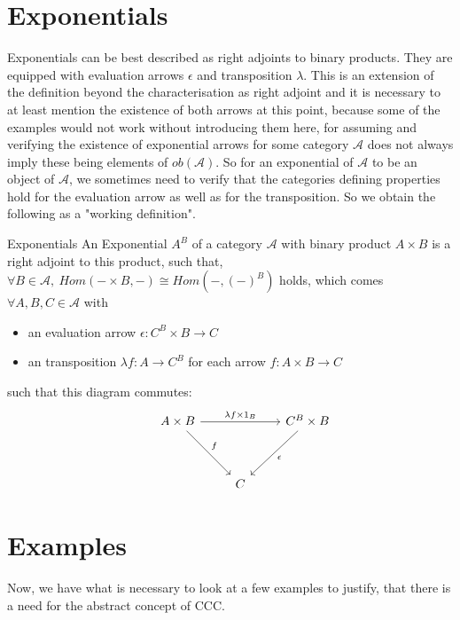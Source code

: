 \section{Exponentials}

Exponentials can be best described as right adjoints to binary products.
They are equipped with evaluation arrows $\epsilon$ and transposition $\lambda$.
This is an extension of the definition beyond the characterisation as right adjoint and it is necessary to at least mention the existence of both arrows at this point, because some of the examples would not work without introducing them here, for assuming and verifying the existence of exponential arrows for some category $\mathcal{A}$ does not always imply these being elements of $ob(\mathcal{A})$.
So for an exponential of $\mathcal{A}$ to be an object of $\mathcal{A}$, we sometimes need to verify that the categories defining properties hold for the evaluation arrow as well as for the transposition.
So we obtain the following as a "working definition".

\newpage

\begin{definition}{Exponentials}
  An Exponential $A^B$ of a category $\mathcal{A}$ with binary product $A \times B$ is a right adjoint to this product, such that, $\forall B \in \mathcal{A}, \ Hom( - \times B, -) \cong Hom(- , (-)^B)$ holds, which comes $\forall A,B,C \in \mathcal{A}$ with
  \begin{itemize}
    \item an evaluation arrow $\epsilon : C^B \times B \to C$
    \item an transposition $\lambda f: A \to C^B$ for each arrow $f: A \times B \to C$
  \end{itemize}
  such that this diagram commutes:
\[
  \begin{tikzcd}[row sep=huge]
    & A \times B \arrow{dr}{f}  \arrow{rr}{\lambda f \times 1_B} && C^B\times B \arrow{dl}{\epsilon} \\
    &&C 
  \end{tikzcd}
\]
\end{definition}



\section{Examples}
Now, we have what is necessary to look at a few examples to justify, that there is a need for the abstract concept of CCC. 
